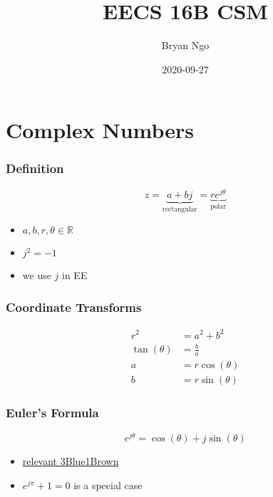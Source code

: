 \documentclass[aspectratio=169]{beamer}
\title{EECS 16B CSM}
\author{Bryan Ngo}
\date{2020-09-27}
\institute{Computer Science Mentors}
\newcommand{\R}{\mathbb{R}}
\begin{document}
\begin{frame}
    \maketitle
\end{frame}

\section{Complex Numbers}

\begin{frame}
    \frametitle{Definition}

    \begin{equation}
        z = \underbrace{a + bj}_{\text{rectangular}} = \underbrace{r e^{j \theta}}_{\text{polar}}
    \end{equation}
    \begin{itemize}
        \item \(a, b, r, \theta \in \R\)
        \item \(j^2 = -1\)
        \item we use \(j\) in EE
    \end{itemize}
\end{frame}

\begin{frame}
    \frametitle{Coordinate Transforms}

    \begin{align}
        r^2 &= a^2 + b^2 \\
        \tan(\theta) &= \frac{b}{a} \\
        a &= r \cos(\theta) \\
        b &= r \sin(\theta)
    \end{align}
\end{frame}

\begin{frame}
    \frametitle{Euler's Formula}

    \begin{equation}
        e^{j \theta} = \cos(\theta) + j \sin(\theta)
    \end{equation}
    \begin{itemize}
        \item \href{https://youtu.be/v0YEaeIClKY}{relevant 3Blue1Brown}
        \item \(e^{j \pi} + 1 = 0\) is a special case
    \end{itemize}
\end{frame}
\end{document}

